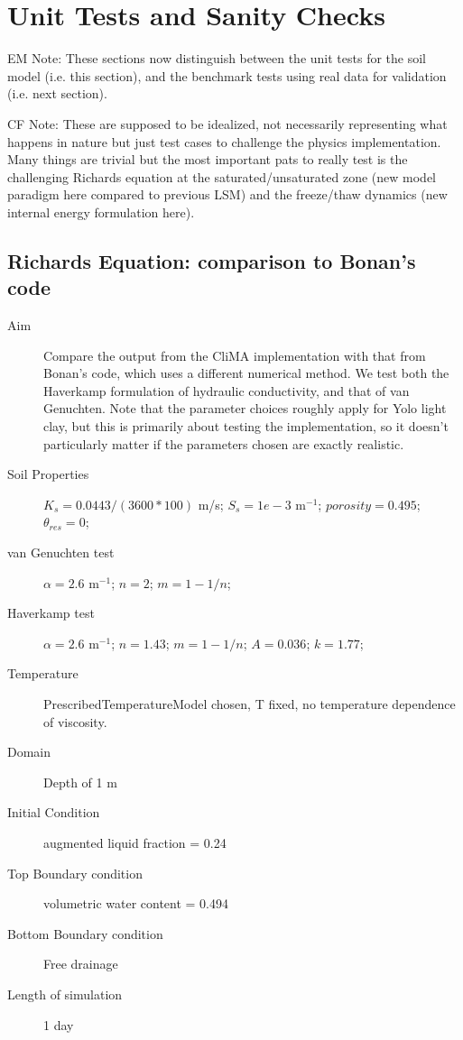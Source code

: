 \documentclass[twoside,10pt]{report}
\begin{document}



\section{Unit Tests and Sanity Checks}

EM Note: These sections now distinguish between the unit tests for the soil model (i.e. this section), and the benchmark tests using real data for validation (i.e. next section).

CF Note: These are supposed to be idealized, not necessarily representing what happens in nature but just test cases to challenge the physics implementation. Many things are trivial but the most important pats to really test is the challenging Richards equation at the saturated/unsaturated zone (new model paradigm here compared to previous LSM) and the freeze/thaw dynamics (new internal energy formulation here).

\subsection{Richards Equation: comparison to Bonan's code}
\begin{description}
\item [Aim] Compare the output from the CliMA implementation with that from Bonan's code, which uses a different numerical method.  We test both the Haverkamp formulation of hydraulic conductivity, and that of van Genuchten. Note that the parameter choices roughly apply for Yolo light clay, but this is primarily about testing the implementation, so it doesn't particularly matter if the parameters chosen are exactly realistic.
\item [Soil Properties] $K_s = 0.0443 / (3600*100)$ m/s; $S_s = 1e-3$ m$^{-1}$; $porosity=0.495$; $\theta_{res}=0$;
\item [van Genuchten test]$\alpha = 2.6$ m$^{-1}$; $n = 2$; $m = 1-1/n$;
\item [Haverkamp test]$\alpha = 2.6$ m$^{-1}$; $n = 1.43$; $m = 1-1/n$; $A = 0.036$; $k = 1.77$;
\item [Temperature] PrescribedTemperatureModel chosen, T fixed, no temperature dependence of viscosity. 
\item [Domain] Depth of 1 m
\item [Initial Condition] augmented liquid fraction = 0.24
\item [Top Boundary condition] volumetric water content = 0.494
\item [Bottom Boundary condition] Free drainage
\item [Length of simulation] 1 day
\end{description}
\end{document}

